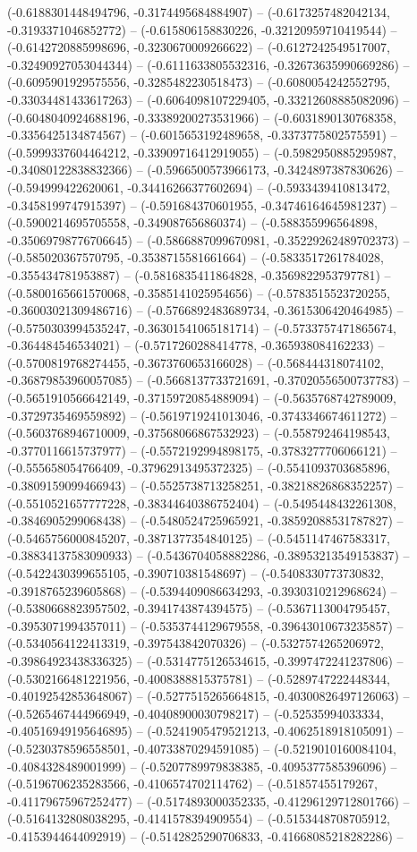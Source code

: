 (-0.6188301448494796, -0.3174495684884907) -- (-0.6173257482042134, -0.3193371046852772) -- (-0.615806158830226, -0.32120959710419544) -- (-0.6142720885998696, -0.3230670009266622) -- (-0.6127242549517007, -0.32490927053044344) -- (-0.6111633805532316, -0.32673635990669286) -- (-0.6095901929575556, -0.3285482230518473) -- (-0.6080054242552795, -0.33034481433617263) -- (-0.6064098107229405, -0.33212608885082096) -- (-0.6048040924688196, -0.33389200273531966) -- (-0.6031890130768358, -0.3356425134874567) -- (-0.6015653192489658, -0.3373775802575591) -- (-0.5999337604464212, -0.33909716412919055) -- (-0.5982950885295987, -0.34080122838832366) -- (-0.5966500573966173, -0.3424897387830626) -- (-0.594999422620061, -0.34416266377602694) -- (-0.5933439410813472, -0.3458199747915397) -- (-0.591684370601955, -0.34746164645981237) -- (-0.5900214695705558, -0.349087656860374) -- (-0.588355996564898, -0.35069798776706645) -- (-0.5866887099670981, -0.35229262489702373) -- (-0.585020367570795, -0.3538715581661664) -- (-0.5833517261784028, -0.355434781953887) -- (-0.5816835411864828, -0.3569822953797781) -- (-0.5800165661570068, -0.3585141025954656) -- (-0.5783515523720255, -0.36003021309486716) -- (-0.5766892483689734, -0.3615306420464985) -- (-0.5750303994535247, -0.36301541065181714) -- (-0.5733757471865674, -0.364484546534021) -- (-0.5717260288414778, -0.365938084162233) -- (-0.5700819768274455, -0.3673760653166028) -- (-0.568444318074102, -0.36879853960057085) -- (-0.5668137733721691, -0.37020556500737783) -- (-0.5651910566642149, -0.37159720854889094) -- (-0.5635768742789009, -0.3729735469559892) -- (-0.5619719241013046, -0.3743346674611272) -- (-0.5603768946710009, -0.37568066867532923) -- (-0.558792464198543, -0.3770116615737977) -- (-0.5572192994898175, -0.3783277706066121) -- (-0.555658054766409, -0.37962913495372325) -- (-0.5541093703685896, -0.3809159099466943) -- (-0.5525738713258251, -0.38218826868352257) -- (-0.5510521657777228, -0.38344640386752404) -- (-0.5495448432261308, -0.3846905299068438) -- (-0.5480524725965921, -0.38592088531787827) -- (-0.5465756000845207, -0.3871377354840125) -- (-0.5451147467583317, -0.38834137583090933) -- (-0.5436704058882286, -0.38953213549153837) -- (-0.5422430399655105, -0.390710381548697) -- (-0.5408330773730832, -0.3918765239605868) -- (-0.5394409086634293, -0.3930310212968624) -- (-0.5380668823957502, -0.3941743874394575) -- (-0.5367113004795457, -0.3953071994357011) -- (-0.5353744129679558, -0.39643010673235857) -- (-0.5340564122413319, -0.397543842070326) -- (-0.5327574265206972, -0.39864923438336325) -- (-0.5314775126534615, -0.3997472241237806) -- (-0.5302166481221956, -0.4008388815375781) -- (-0.5289747222448344, -0.40192542853648067) -- (-0.5277515265664815, -0.40300826497126063) -- (-0.5265467444966949, -0.40408900030798217) -- (-0.52535994033334, -0.40516949195646895) -- (-0.5241905479521213, -0.4062518918105091) -- (-0.5230378596558501, -0.40733870294591085) -- (-0.5219010160084104, -0.4084328489001999) -- (-0.5207789979838385, -0.4095377585396096) -- (-0.5196706235283566, -0.4106574702114762) -- (-0.51857455179267, -0.41179675967252477) -- (-0.5174893000352335, -0.41296129712801766) -- (-0.5164132808038295, -0.4141578394909554) -- (-0.5153448708705912, -0.4153944644092919) -- (-0.5142825290706833, -0.41668085218282286) -- 